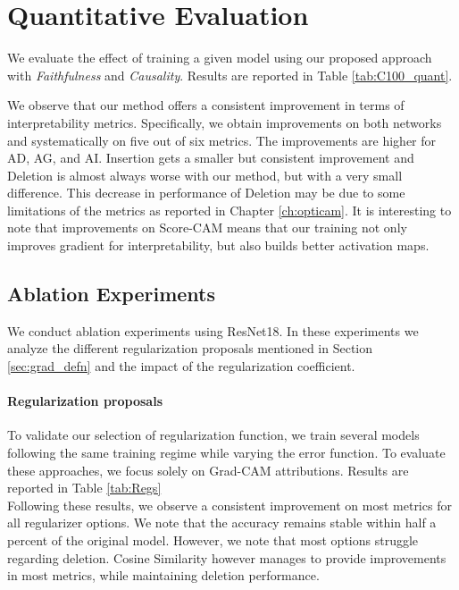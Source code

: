 \section{Quantitative Evaluation}
\label{sec:grad_quant}
We evaluate the effect of training a given model using our proposed approach with 
\textit{Faithfulness} and \textit{Causality}. Results are reported in Table \ref{tab:C100_quant}.

\noindent We observe that our method offers a consistent improvement in terms of interpretability 
metrics. Specifically, we obtain improvements on both networks and systematically on five out of 
six metrics. The improvements are higher for AD, AG, and AI. Insertion gets a smaller but consistent 
improvement and Deletion is almost always worse with our method, but with a very small difference.
This decrease in performance of Deletion may be due to some limitations of the metrics as reported 
in Chapter \ref{ch:opticam}.
It is interesting to note that improvements on Score-CAM means that our training not only improves 
gradient for interpretability, but also builds better activation maps.\\

\subsection{Ablation Experiments}
We conduct ablation experiments using ResNet18. In these experiments we analyze the different 
regularization proposals mentioned in Section \ref{sec:grad_defn} and the impact of the 
regularization coefficient.

\paragraph{Regularization proposals} 
To validate our selection of regularization function, we train several models following the same 
training regime while varying the error function. To evaluate these approaches, we focus solely on 
Grad-CAM attributions. Results are reported in Table \ref{tab:Regs}\\

\noindent Following these results, we observe a consistent improvement on most metrics for all 
regularizer options. We note that the accuracy remains stable within half a percent of the original 
model. However, we note that most options struggle regarding deletion. Cosine Similarity however 
manages to provide improvements in most metrics, while maintaining deletion performance.


